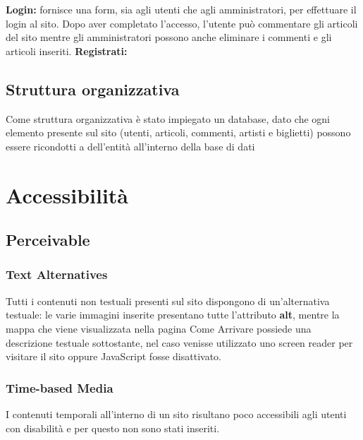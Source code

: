 \documentclass[10pt, a4paper]{article}
\begin{document}
\newline \textbf{Login: }fornisce una form, sia agli utenti che agli amministratori, per effettuare il login al sito. Dopo aver completato l'accesso, l'utente può commentare gli articoli del sito mentre gli amministratori possono anche eliminare i commenti e gli articoli inseriti.
\newline \textbf{Registrati: }
\subsection{Struttura organizzativa}
Come struttura organizzativa è stato impiegato un database, dato che ogni elemento presente sul sito (utenti, articoli, commenti, artisti e biglietti) possono essere ricondotti a dell'entità all'interno della base di dati
\section{Accessibilità}

\subsection{Perceivable}

\subsubsection{Text Alternatives}
Tutti i contenuti non testuali presenti sul sito dispongono di un'alternativa testuale: le varie immagini inserite presentano tutte l'attributo \textbf{alt}, mentre la mappa che viene visualizzata nella pagina Come Arrivare possiede una descrizione testuale sottostante, nel caso venisse utilizzato uno screen reader per visitare il sito oppure JavaScript fosse disattivato.

\subsubsection{Time-based Media}
I contenuti temporali all'interno di un sito risultano poco accessibili agli utenti con disabilità e per questo non sono stati inseriti.
\end{document}
